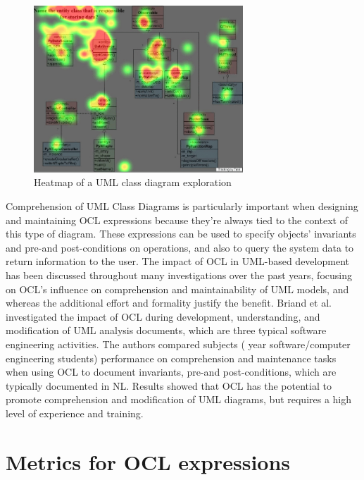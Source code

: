 \begin{figure}[ht]
\centering
\includegraphics[width=0.7\textwidth]{Template/Chapters/figures/4_RelatedWork/02_HeatMap.png}
\caption{Heatmap of a UML class diagram exploration~\cite{Yusuf2007}}
\label{fig:02_heatmap}
\end{figure}

Comprehension of UML Class Diagrams is particularly important when designing and maintaining OCL expressions because they're always tied to the context of this type of diagram. These expressions can be used to specify objects' invariants and pre-and post-conditions on operations, and also to query the system data to return information to the user. The impact of OCL in UML-based development has been discussed throughout many investigations over the past years, focusing on OCL's influence on comprehension and maintainability of UML models, and whereas the additional effort and formality justify the benefit. Briand et al. ~\cite{Briand2004,Briand2005} investigated the impact of OCL during development, understanding, and modification of UML analysis documents, which are three typical software engineering activities. The authors compared subjects ( year software/computer engineering students) performance on comprehension and maintenance tasks when using OCL to document invariants, pre-and post-conditions, which are typically documented in NL. Results showed that OCL has the potential to promote comprehension and modification of UML diagrams, but requires a high level of experience and training.

\section{Metrics for OCL expressions} 
\label{sec:RelatedWork-Metrics}


